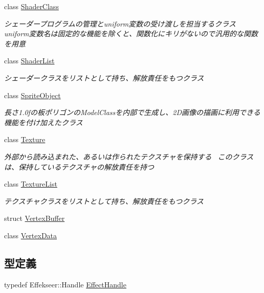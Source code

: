 \begin{DoxyCompactItemize}
\item 
class \mbox{\hyperlink{class_k___graphics_1_1_shader_class}{Shader\+Class}}
\begin{DoxyCompactList}\small\item\em シェーダープログラムの管理とuniform変数の受け渡しを担当するクラス uniform変数名は固定的な機能を除くと、関数化にキリがないので汎用的な関数を用意 \end{DoxyCompactList}\item 
class \mbox{\hyperlink{class_k___graphics_1_1_shader_list}{Shader\+List}}
\begin{DoxyCompactList}\small\item\em シェーダークラスをリストとして持ち、解放責任をもつクラス \end{DoxyCompactList}\item 
class \mbox{\hyperlink{class_k___graphics_1_1_sprite_object}{Sprite\+Object}}
\begin{DoxyCompactList}\small\item\em 長さ1.0fの板ポリゴンの\+Model\+Classを内部で生成し、2\+D画像の描画に利用できる機能を付け加えたクラス \end{DoxyCompactList}\item 
class \mbox{\hyperlink{class_k___graphics_1_1_texture}{Texture}}
\begin{DoxyCompactList}\small\item\em 外部から読み込まれた、あるいは作られたテクスチャを保持する~\newline
このクラスは、保持しているテクスチャの解放責任を持つ \end{DoxyCompactList}\item 
class \mbox{\hyperlink{class_k___graphics_1_1_texture_list}{Texture\+List}}
\begin{DoxyCompactList}\small\item\em テクスチャクラスをリストとして持ち、解放責任をもつクラス \end{DoxyCompactList}\item 
struct \mbox{\hyperlink{struct_k___graphics_1_1_vertex_buffer}{Vertex\+Buffer}}
\item 
class \mbox{\hyperlink{class_k___graphics_1_1_vertex_data}{Vertex\+Data}}
\end{DoxyCompactItemize}
\subsection*{型定義}
\begin{DoxyCompactItemize}
\item 
typedef Effekseer\+::\+Handle \mbox{\hyperlink{namespace_k___graphics_afb3a0fd0adc77eb95104e697c9b6b7a9}{Effect\+Handle}}
\end{DoxyCompactItemize}
